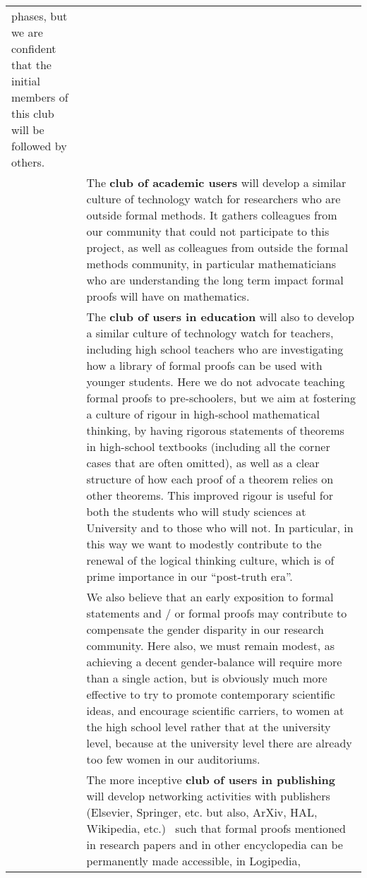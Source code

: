\begin{longtable*}{|p{0.2\textwidth}|p{0.75\textwidth}|}
phases, but we are confident that the initial members of this club
will be followed by others.\\ 
&
\hspace{0.4cm}
The {\bf club of academic users}
will develop a similar culture of technology watch for
researchers who are outside formal methods.  
It gathers colleagues from our community that could not participate to
this project, as well as colleagues from outside the formal methods
community, in particular mathematicians who are understanding
the long term impact formal proofs will have on mathematics.\\
&
\hspace{0.4cm}
The {\bf club of users in education}
will also to develop a similar culture of
technology watch for teachers, including high school teachers who are
investigating how a library of formal proofs can be used with younger
students. Here we do not advocate teaching formal proofs to pre-schoolers, but
we aim at fostering a culture of rigour in high-school mathematical
thinking, by having rigorous statements of theorems in high-school
textbooks (including all the corner cases that are often omitted), as
well as a clear structure of how each proof of a theorem relies on
other theorems. This improved rigour is useful for both the students
who will study sciences at University and to those who will not. In
particular, in this way we want to modestly contribute to the renewal
of the logical thinking culture, which is of prime importance in our
``post-truth era''.\\
&
\hspace{0.4cm}
We also believe that an early exposition to formal statements and / or
formal proofs may contribute to compensate the gender disparity
in our research community. Here also, we must remain modest, as
achieving a decent gender-balance will require more than a single
action, but is obviously much more effective to try to promote
contemporary scientific ideas, and encourage scientific carriers, to
women at the high school level rather that at the university level,
because at the university level there are already too few women in
our auditoriums.\\
&
\hspace{0.4cm}
The more inceptive {\bf club of users in publishing} 
will develop networking activities with publishers
(Elsevier, Springer, etc. but also, ArXiv, HAL, Wikipedia, etc.)~
such that formal proofs mentioned in research papers and in
other encyclopedia can be permanently made accessible, in Logipedia, 

\end{longtable*}
